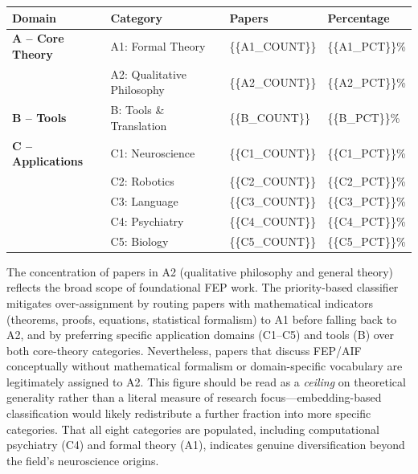 \documentclass[
]{article}
\newcounter{none} %
\begin{document}
{\def\LTcaptype{none} %
\begin{longtable}[]{@{}
  >{\raggedright\arraybackslash}p{}
  >{\raggedright\arraybackslash}p{}
  >{\raggedright\arraybackslash}p{}
  >{\raggedright\arraybackslash}p{}@{}}
\toprule\noalign{}
\begin{minipage}[b]{\linewidth}\raggedright
Domain
\end{minipage} & \begin{minipage}[b]{\linewidth}\raggedright
Category
\end{minipage} & \begin{minipage}[b]{\linewidth}\raggedright
Papers
\end{minipage} & \begin{minipage}[b]{\linewidth}\raggedright
Percentage
\end{minipage} \\
\midrule\noalign{}
\endhead
\bottomrule\noalign{}
\endlastfoot
\textbf{A -- Core Theory} & A1: Formal Theory & \{\{A1\_COUNT\}\} &
\{\{A1\_PCT\}\}\% \\
& A2: Qualitative Philosophy & \{\{A2\_COUNT\}\} & \{\{A2\_PCT\}\}\% \\
\textbf{B -- Tools} & B: Tools \& Translation & \{\{B\_COUNT\}\} &
\{\{B\_PCT\}\}\% \\
\textbf{C -- Applications} & C1: Neuroscience & \{\{C1\_COUNT\}\} &
\{\{C1\_PCT\}\}\% \\
& C2: Robotics & \{\{C2\_COUNT\}\} & \{\{C2\_PCT\}\}\% \\
& C3: Language & \{\{C3\_COUNT\}\} & \{\{C3\_PCT\}\}\% \\
& C4: Psychiatry & \{\{C4\_COUNT\}\} & \{\{C4\_PCT\}\}\% \\
& C5: Biology & \{\{C5\_COUNT\}\} & \{\{C5\_PCT\}\}\% \\
\end{longtable}
}

The concentration of papers in A2 (qualitative philosophy and general
theory) reflects the broad scope of foundational FEP work. The
priority-based classifier mitigates over-assignment by routing papers
with mathematical indicators (theorems, proofs, equations, statistical
formalism) to A1 before falling back to A2, and by preferring specific
application domains (C1--C5) and tools (B) over both core-theory
categories. Nevertheless, papers that discuss FEP/AIF conceptually
without mathematical formalism or domain-specific vocabulary are
legitimately assigned to A2. This figure should be read as a
\emph{ceiling} on theoretical generality rather than a literal measure
of research focus---embedding-based classification would likely
redistribute a further fraction into more specific categories. That all
eight categories are populated, including computational psychiatry (C4)
and formal theory (A1), indicates genuine diversification beyond the
field's neuroscience origins.
\end{document}
